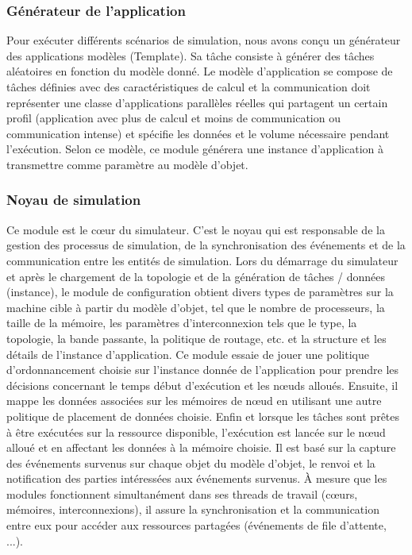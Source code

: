\subsubsection{Générateur de l'application}
%
Pour exécuter différents scénarios de simulation, nous avons conçu un générateur des applications modèles (Template). Sa tâche consiste à générer des tâches aléatoires en fonction du modèle donné. Le modèle d'application se compose de tâches définies avec des caractéristiques de calcul et la communication doit représenter une classe d'applications parallèles réelles qui partagent un certain profil (application avec plus de calcul et moins de communication ou communication intense) et spécifie les données et le volume nécessaire pendant l'exécution. Selon ce modèle, ce module générera une instance d'application à transmettre comme paramètre au modèle d'objet.
%
\subsubsection{Noyau de simulation}  %
%
Ce module est le cœur du simulateur. C'est le noyau qui est responsable de la gestion des processus de simulation, de la synchronisation des événements et de la communication entre les entités de simulation. Lors du démarrage du simulateur et après le chargement de la topologie et de la génération de tâches / données (instance), le module de configuration obtient divers types de paramètres sur la machine cible à partir du modèle d'objet, tel que le nombre de processeurs, la taille de la mémoire, les paramètres d'interconnexion tels que le type, la topologie, la bande passante, la politique de routage, etc. et la structure et les détails de l'instance d'application. Ce module essaie de jouer une politique d'ordonnancement choisie sur l'instance donnée de l'application pour prendre les décisions concernant le temps début d'exécution et les nœuds alloués. Ensuite, il mappe les données associées sur les mémoires de nœud en utilisant une autre politique de placement de données choisie. Enfin et lorsque les tâches sont prêtes à être exécutées sur la ressource disponible, l'exécution est lancée sur le nœud alloué et en affectant les données à la mémoire choisie. Il est basé sur la capture des événements survenus sur chaque objet du modèle d'objet, le renvoi et la notification des parties intéressées aux événements survenus. À mesure que les modules fonctionnent simultanément dans ses threads de travail (cœurs, mémoires, interconnexions), il assure la synchronisation et la communication entre eux pour accéder aux ressources partagées (événements de file d'attente, ...).

